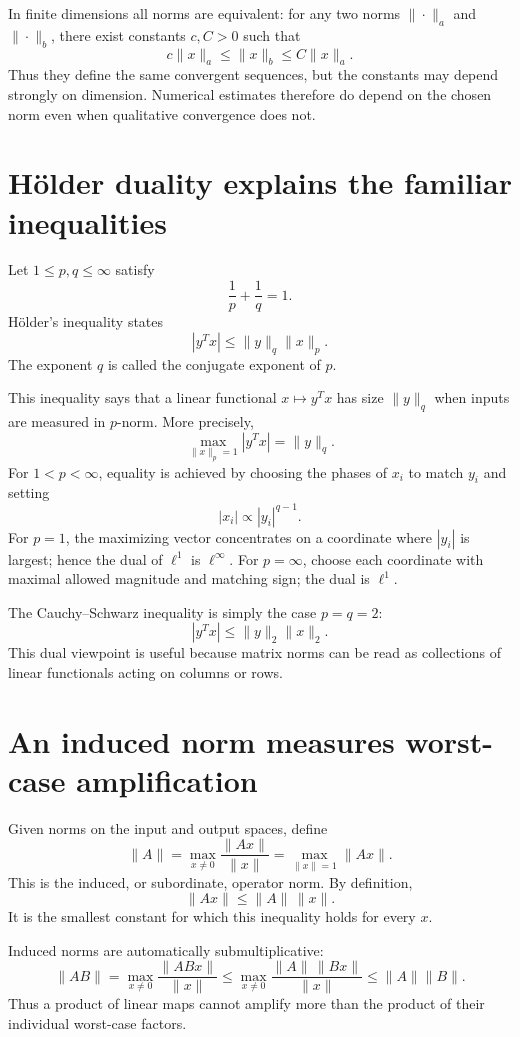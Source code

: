 In finite dimensions all norms are equivalent: for any two norms \(\|\cdot\|_a\) and \(\|\cdot\|_b\), there exist constants \(c,C>0\) such that
\[
  c\|x\|_a\le \|x\|_b\le C\|x\|_a.
\]
Thus they define the same convergent sequences, but the constants may depend strongly on dimension.  Numerical estimates therefore do depend on the chosen norm even when qualitative convergence does not.

\section{Hölder duality explains the familiar inequalities}

Let \(1\le p,q\le\infty\) satisfy
\[
  \frac1p+\frac1q=1.
\]
Hölder's inequality states
\[
  |y^Tx|\le \|y\|_q\|x\|_p.
\]
The exponent \(q\) is called the conjugate exponent of \(p\).

This inequality says that a linear functional \(x\mapsto y^Tx\) has size \(\|y\|_q\) when inputs are measured in \(p\)-norm.  More precisely,
\[
  \max_{\|x\|_p=1}|y^Tx|=\|y\|_q.
\]
For \(1<p<\infty\), equality is achieved by choosing the phases of \(x_i\) to match \(y_i\) and setting
\[
  |x_i|\propto |y_i|^{q-1}.
\]
For \(p=1\), the maximizing vector concentrates on a coordinate where \(|y_i|\) is largest; hence the dual of \(\ell^1\) is \(\ell^\infty\).  For \(p=\infty\), choose each coordinate with maximal allowed magnitude and matching sign; the dual is \(\ell^1\).

The Cauchy--Schwarz inequality is simply the case \(p=q=2\):
\[
  |y^Tx|\le \|y\|_2\|x\|_2.
\]
This dual viewpoint is useful because matrix norms can be read as collections of linear functionals acting on columns or rows.

\section{An induced norm measures worst-case amplification}

Given norms on the input and output spaces, define
\[
  \|A\|=\max_{x\ne0}\frac{\|Ax\|}{\|x\|}
  =\max_{\|x\|=1}\|Ax\|.
\]
This is the induced, or subordinate, operator norm.  By definition,
\[
  \|Ax\|\le \|A\|\,\|x\|.
\]
It is the smallest constant for which this inequality holds for every \(x\).

Induced norms are automatically submultiplicative:
\[
  \|AB\|
  =\max_{x\ne0}\frac{\|ABx\|}{\|x\|}
  \le
  \max_{x\ne0}
  \frac{\|A\|\,\|Bx\|}{\|x\|}
  \le \|A\|\|B\|.
\]
Thus a product of linear maps cannot amplify more than the product of their individual worst-case factors.

